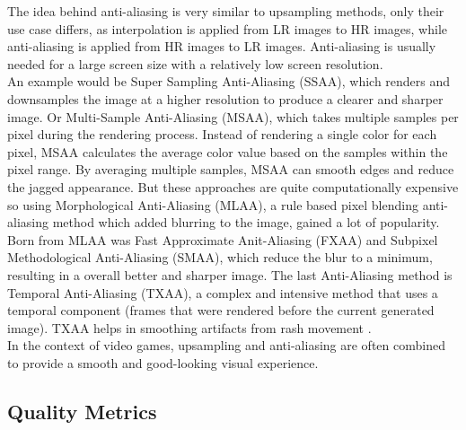 \documentclass[letterpaper, 10 pt, conference]{ieeeconf}  %
\begin{document}
The idea behind anti-aliasing is very similar to upsampling methods, only their use case differs, as interpolation is applied from LR images to HR images, while anti-aliasing is applied from HR images to LR images.
Anti-aliasing is usually needed for a large screen size with a relatively low screen resolution.\\
An example would be Super Sampling Anti-Aliasing (SSAA), which renders and downsamples the image at a higher resolution to produce a clearer and sharper image. 
Or Multi-Sample Anti-Aliasing (MSAA), which takes multiple samples per pixel during the rendering process. 
Instead of rendering a single color for each pixel, MSAA calculates the average color value based on the samples within the pixel range. 
By averaging multiple samples, MSAA can smooth edges and reduce the jagged appearance.
But these approaches are quite computationally expensive so using Morphological Anti-Aliasing (MLAA), a rule based pixel blending anti-aliasing method which added blurring to the image, gained a lot of popularity. 
Born from MLAA was Fast Approximate Anit-Aliasing (FXAA) and Subpixel Methodological Anti-Aliasing (SMAA), which reduce the blur to a minimum, resulting in a overall better and sharper image.
The last Anti-Aliasing method is Temporal Anti-Aliasing (TXAA), a complex and intensive method that uses a temporal component (frames that were rendered before the current generated image). 
TXAA helps in smoothing artifacts from rash movement \cite{antialiasing_types} \cite{gu2022super} \cite{stuttgart_boy}.\\
In the context of video games, upsampling and anti-aliasing are often combined to provide a smooth and good-looking visual experience.

\subsection{Quality Metrics}
\end{document}
